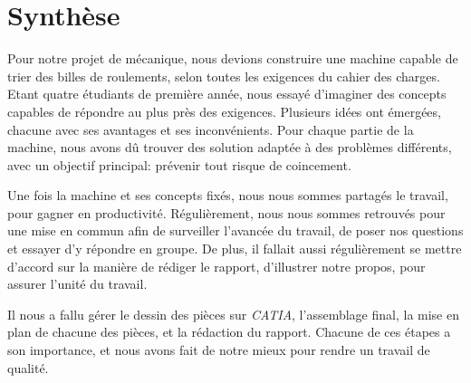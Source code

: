 \chapter{Synthèse}
Pour notre projet de mécanique, nous devions construire une machine capable de trier des billes de roulements, selon toutes les exigences du cahier des charges. Etant quatre étudiants de première année, nous essayé d'imaginer des concepts capables de répondre au plus près des exigences. Plusieurs idées ont émergées, chacune avec ses avantages et ses inconvénients. Pour chaque partie de la machine, nous avons dû trouver des solution adaptée à des problèmes différents, avec un objectif principal: prévenir tout risque de coincement.

Une fois la machine et ses concepts fixés, nous nous sommes partagés le travail, pour gagner en productivité. Régulièrement, nous nous sommes retrouvés pour une mise en commun afin de surveiller l'avancée du travail, de poser nos questions et essayer d'y répondre en groupe. De plus, il fallait aussi régulièrement se mettre d'accord sur la manière de rédiger le rapport, d'illustrer notre propos, pour assurer l'unité du travail. 

Il nous a fallu gérer le dessin des pièces sur \emph{CATIA}, l'assemblage final, la mise en plan de chacune des pièces, et la rédaction du rapport. Chacune de ces étapes a son importance, et nous avons fait de notre mieux pour rendre un travail de qualité.